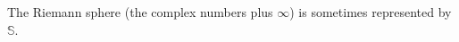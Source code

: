 \documentclass{article}
\begin{document}
	
	\renewcommand{\S}{\mathbb{S}}
	
	The Riemann sphere (the complex numbers plus $\infty$) is 
	sometimes represented by \( \S \).
\end{document}
